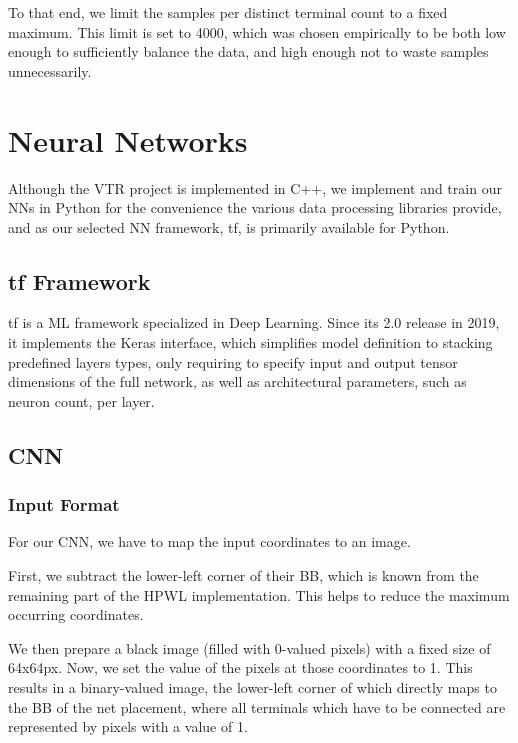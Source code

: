 To that end, we limit the samples per distinct terminal count to a fixed maximum. This limit is set to 4000, which was chosen empirically to be both low enough to sufficiently balance the data, and high enough not to waste samples unnecessarily.

\section{Neural Networks}

Although the \gls{VTR} project is implemented in C++, we implement and train our \glspl{NN} in Python for the convenience the various data processing libraries provide, and as our selected \gls{NN} framework, \gls{tf}, is primarily available for Python.

\subsection{\gls{tf} Framework}

\gls{tf} is a \gls{ML} framework specialized in Deep Learning.\cite{tensorflow2015-whitepaper} Since its 2.0 release in 2019, it implements the Keras interface\cite{chollet2015keras}, which simplifies model definition to stacking predefined layers types, only requiring to specify input and output tensor dimensions of the full network, as well as architectural parameters, such as neuron count, per layer.

\subsection{\gls{CNN}}



\subsubsection{Input Format}

For our \gls{CNN}, we have to map the input coordinates to an image. 

First, we subtract the lower-left corner of their \gls{BB}, which is known from the remaining part of the \gls{HPWL} implementation. This helps to reduce the maximum occurring coordinates.

We then prepare a black image (filled with 0-valued pixels) with a fixed size of 64x64px\cite{TODO}. Now, we set the value of the pixels at those coordinates to 1. This results in a binary-valued image, the lower-left corner of which directly maps to the \gls{BB} of the net placement, where all terminals which have to be connected are represented by pixels with a value of 1.

